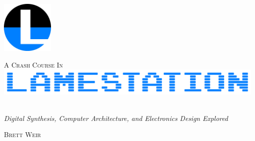 \documentclass[twoside,openright]{scrbook}
\begin{document}
\begin{titlepage}
    \begin{flushright}

        \includegraphics[width=1in]{graphics/lamestation-seal-800px.png}

        \vspace*{0.3\textheight}

        \textsc{\LARGE A Crash Course In}
        {\color{gray}{\rule{\textwidth}{1pt}}}
        \includegraphics[width=\textwidth]{graphics/ls-logo-blue_1600.png}~\\[-0.4cm]
        {\color{gray}{\rule{\textwidth}{1pt}}}

        \textit{Digital Synthesis, Computer Architecture, and Electronics Design Explored}

        \vfill
        \textsc{\Large Brett Weir}


    \end{flushright}
\end{titlepage}

\frontmatter

\newpage
														
\tableofcontents

\newpage

\mainmatter
\end{document}
